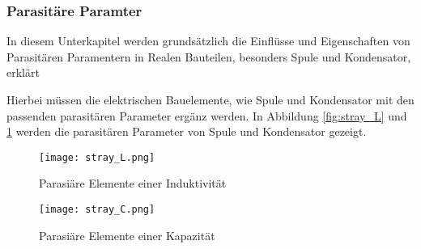 \subsubsection{Parasitäre Paramter}\label{subsec:parasitparam}
In diesem Unterkapitel werden grundsätzlich die Einflüsse und Eigenschaften von Parasitären Paramentern in Realen Bauteilen, besonders Spule und Kondensator, erklärt

Hierbei müssen die elektrischen Bauelemente, wie Spule und Kondensator mit den passenden parasitären Parameter ergänz werden. In Abbildung \ref{fig:stray_L} und \ref{fig:stray_C} werden die parasitären Parameter von Spule und Kondensator gezeigt.
\begin{figure}[H]
	\begin{minipage}[h]{0.45\linewidth}
		\centering
		\texttt{[image: stray\_L.png]}
		\label{fig:stray_L}
		\caption{Parasiäre Elemente einer Induktivität \cite{aufgabenstellung}}
	\end{minipage}
	\begin{minipage}[h]{0.45\linewidth}
		\centering
		\texttt{[image: stray\_C.png]}
		\label{fig:stray_C}
		\caption{Parasiäre Elemente einer Kapazität \cite{aufgabenstellung}}
	\end{minipage}
\end{figure}